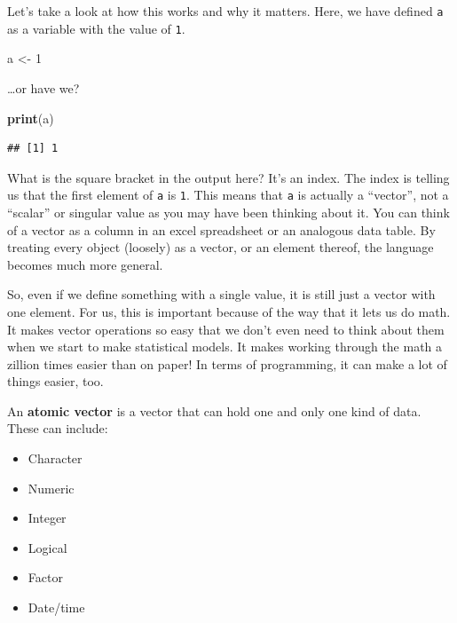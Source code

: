 \documentclass[
]{book}
\newenvironment{Shaded}{\begin{snugshade}}{\end{snugshade}}
\newcommand{\DecValTok}[1]{\textcolor[rgb]{0.00,0.00,0.81}{#1}}
\newcommand{\KeywordTok}[1]{\textcolor[rgb]{0.13,0.29,0.53}{\textbf{#1}}}
\newcommand{\NormalTok}[1]{#1}
\newcommand{\StringTok}[1]{\textcolor[rgb]{0.31,0.60,0.02}{#1}}
\providecommand{\tightlist}{%
  \setlength{\itemsep}{0pt}\setlength{\parskip}{0pt}}
\begin{document}
Let's take a look at how this works and why it matters. Here, we have defined \texttt{a} as a variable with the value of \texttt{1}.

\begin{Shaded}
\begin{Highlighting}[]
\NormalTok{a <-}\StringTok{ }\DecValTok{1}
\end{Highlighting}
\end{Shaded}

\ldots or have we?

\begin{Shaded}
\begin{Highlighting}[]
\KeywordTok{print}\NormalTok{(a)}
\end{Highlighting}
\end{Shaded}

\begin{verbatim}
## [1] 1
\end{verbatim}

What is the square bracket in the output here? It's an index. The index is telling us that the first element of \texttt{a} is \texttt{1}. This means that \texttt{a} is actually a ``vector'', not a ``scalar'' or singular value as you may have been thinking about it. You can think of a vector as a column in an excel spreadsheet or an analogous data table. By treating every object (loosely) as a vector, or an element thereof, the language becomes much more general.

So, even if we define something with a single value, it is still just a vector with one element. For us, this is important because of the way that it lets us do math. It makes vector operations so easy that we don't even need to think about them when we start to make statistical models. It makes working through the math a zillion times easier than on paper! In terms of programming, it can make a lot of things easier, too.

An \textbf{atomic vector} is a vector that can hold one and only one kind of data. These can include:

\begin{itemize}
\tightlist
\item
  Character
\item
  Numeric
\item
  Integer
\item
  Logical
\item
  Factor
\item
  Date/time
\end{itemize}
\end{document}

